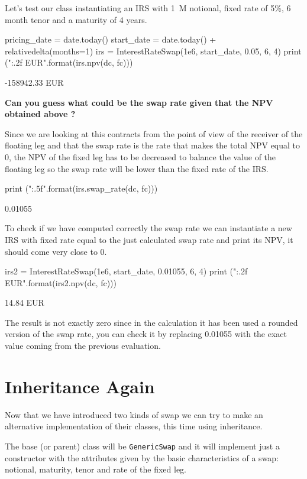 Let's test our class instantiating an IRS with 1~M notional, fixed rate of 5\%, 6 month tenor and a maturity of 4 years.

\begin{ipython}
pricing_date = date.today()
start_date = date.today() + relativedelta(months=1)
irs = InterestRateSwap(1e6, start_date, 0.05, 6, 4)
print ("{:.2f} EUR".format(irs.npv(dc, fc)))
\end{ipython}
\begin{ioutput}
-158942.33 EUR
\end{ioutput}

\textbf{Can you guess what could be the \textbf{swap rate} given that the NPV obtained above ?}

Since we are looking at this contracts from the point of view of the receiver of the floating leg and that the swap rate is the rate that makes the total NPV equal to 0, the NPV of the fixed leg has to be decreased to balance the value of the floating leg so the swap rate will be lower than the fixed rate of the IRS.

\begin{ipython}
print ("{:.5f}".format(irs.swap_rate(dc, fc)))
\end{ipython}
\begin{ioutput}
0.01055
\end{ioutput}
    
To check if we have computed correctly the swap rate we can instantiate a new IRS with fixed rate equal to the just calculated swap rate and print its NPV, it should come very close to 0.

\begin{ipython}
irs2 = InterestRateSwap(1e6, start_date, 0.01055, 6, 4)
print ("{:.2f} EUR".format(irs2.npv(dc, fc)))
\end{ipython}
\begin{ioutput}
14.84 EUR
\end{ioutput}

The result is not exactly zero since in the calculation it has been used a rounded version of the swap rate, you can check it by replacing 0.01055 with the exact value coming from the previous evaluation. 
   
\section{Inheritance Again}
\begin{finmarkets}
Now that we have introduced two kinds of swap we can try to make an alternative implementation of their classes, this time using inheritance.

The base (or parent) class will be \texttt{GenericSwap} and it will implement just a constructor with the attributes given by the basic characteristics of a swap: notional, maturity, tenor and rate of the fixed leg.
\end{finmarkets}

